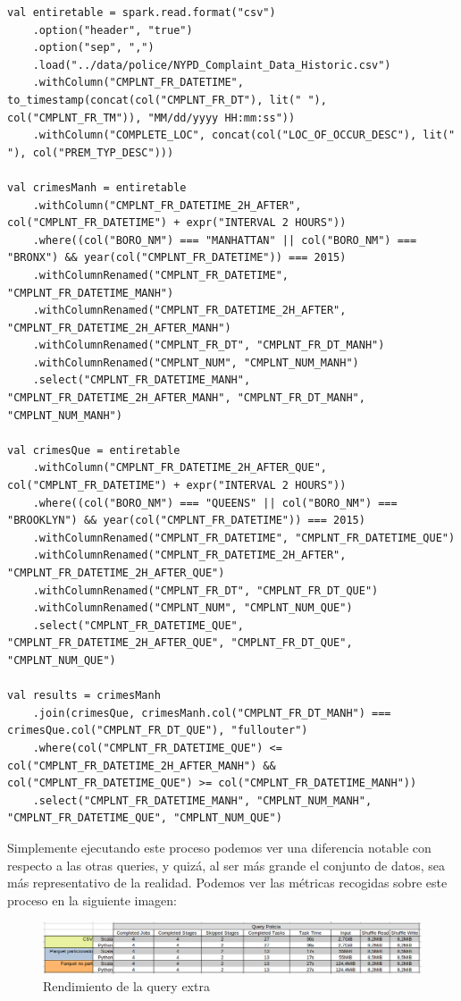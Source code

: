\documentclass[12pt,twoside,titlepage]{report}
\begin{document}
\begin{lstlisting}
val entiretable = spark.read.format("csv")
	.option("header", "true")
	.option("sep", ",")
	.load("../data/police/NYPD_Complaint_Data_Historic.csv")    
	.withColumn("CMPLNT_FR_DATETIME", to_timestamp(concat(col("CMPLNT_FR_DT"), lit(" "), col("CMPLNT_FR_TM")), "MM/dd/yyyy HH:mm:ss"))
	.withColumn("COMPLETE_LOC", concat(col("LOC_OF_OCCUR_DESC"), lit(" "), col("PREM_TYP_DESC")))
	
val crimesManh = entiretable
	.withColumn("CMPLNT_FR_DATETIME_2H_AFTER", col("CMPLNT_FR_DATETIME") + expr("INTERVAL 2 HOURS"))
	.where((col("BORO_NM") === "MANHATTAN" || col("BORO_NM") === "BRONX") && year(col("CMPLNT_FR_DATETIME")) === 2015)
	.withColumnRenamed("CMPLNT_FR_DATETIME", "CMPLNT_FR_DATETIME_MANH")
	.withColumnRenamed("CMPLNT_FR_DATETIME_2H_AFTER", "CMPLNT_FR_DATETIME_2H_AFTER_MANH")
	.withColumnRenamed("CMPLNT_FR_DT", "CMPLNT_FR_DT_MANH")
	.withColumnRenamed("CMPLNT_NUM", "CMPLNT_NUM_MANH")
	.select("CMPLNT_FR_DATETIME_MANH", "CMPLNT_FR_DATETIME_2H_AFTER_MANH", "CMPLNT_FR_DT_MANH", "CMPLNT_NUM_MANH")

val crimesQue = entiretable
	.withColumn("CMPLNT_FR_DATETIME_2H_AFTER_QUE", col("CMPLNT_FR_DATETIME") + expr("INTERVAL 2 HOURS"))
	.where((col("BORO_NM") === "QUEENS" || col("BORO_NM") === "BROOKLYN") && year(col("CMPLNT_FR_DATETIME")) === 2015)
	.withColumnRenamed("CMPLNT_FR_DATETIME", "CMPLNT_FR_DATETIME_QUE")
	.withColumnRenamed("CMPLNT_FR_DATETIME_2H_AFTER", "CMPLNT_FR_DATETIME_2H_AFTER_QUE")
	.withColumnRenamed("CMPLNT_FR_DT", "CMPLNT_FR_DT_QUE")
	.withColumnRenamed("CMPLNT_NUM", "CMPLNT_NUM_QUE")
	.select("CMPLNT_FR_DATETIME_QUE", "CMPLNT_FR_DATETIME_2H_AFTER_QUE", "CMPLNT_FR_DT_QUE", "CMPLNT_NUM_QUE")
	
val results = crimesManh
	.join(crimesQue, crimesManh.col("CMPLNT_FR_DT_MANH") === crimesQue.col("CMPLNT_FR_DT_QUE"), "fullouter")
	.where(col("CMPLNT_FR_DATETIME_QUE") <= col("CMPLNT_FR_DATETIME_2H_AFTER_MANH") &&
col("CMPLNT_FR_DATETIME_QUE") >= col("CMPLNT_FR_DATETIME_MANH"))
	.select("CMPLNT_FR_DATETIME_MANH", "CMPLNT_NUM_MANH", "CMPLNT_FR_DATETIME_QUE", "CMPLNT_NUM_QUE")
\end{lstlisting}

Simplemente ejecutando este proceso podemos ver una diferencia notable con respecto a las otras queries, y quizá, al ser más grande el conjunto de datos, sea más representativo de la realidad. Podemos ver las métricas recogidas sobre este proceso en la siguiente imagen:

\begin{figure}[H]
	\includegraphics[scale=0.375]{comparativapolicia.png}
	\centering
	\caption{Rendimiento de la query extra}
	\label{fig:comppolicia}
	\centering
\end{figure}
\end{document}
